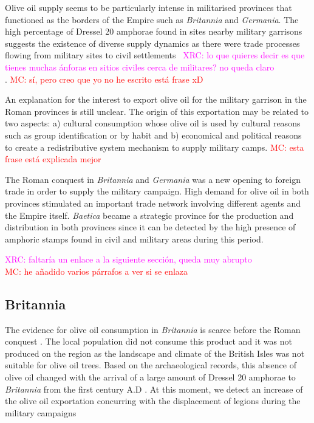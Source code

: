 \documentclass[review]{elsarticle}
\newcommand{\memo}[2]{\textcolor{#1}{#2}}
\newcommand{\maria}[1]{\memo{red}{MC: #1\\}}
\newcommand{\xavi}[1]{\memo{magenta}{XRC: #1\\}}
\begin{document}
Olive oil supply seems to be particularly intense in militarised provinces that functioned as the borders of the Empire such as \textit{Britannia} and \textit{Germania}. The high percentage of Dressel 20 amphorae found in sites nearby military garrisons suggests the existence of diverse supply dynamics as there were trade processes flowing from military sites to civil settlements~\citep{remesal_annona_1986, carreras_britannia_1998}
\xavi{lo que quieres decir es que tienes muchas ánforas en sitios civiles cerca de militares? no queda claro}.
\maria{sí, pero creo que yo no he escrito está frase xD}

An explanation for the interest to export olive oil for the military garrison in the Roman provinces is still unclear. The origin of this exportation may be related to two aspects: a) cultural consumption whose olive oil is used by cultural reasons such as group identification or by habit and b) economical and political reasons to create a redistributive system mechanism to supply military camps. 
\maria{esta frase está explicada mejor}


The Roman conquest in \textit{Britannia} and \textit{Germania} was a new opening to foreign trade in order to supply the military campaign. High demand for olive oil in both provinces stimulated an important trade network involving different agents and the Empire itself. \textit{Baetica} became a strategic province for the production and distribution in both provinces since it can be detected by the high presence of amphoric stamps found in civil and military areas during this period. 

\xavi{faltaría un enlace a la siguiente sección, queda muy abrupto}
\maria{he añadido varios párrafos a ver si se enlaza}


\subsection{Britannia}

The evidence for olive oil consumption in \textit{Britannia} is scarce before the Roman conquest \citep{funari_corpus_1996,carreras_abastecimiento_2003}. The local population did not consume this product and it was not produced on the region as the landscape and climate of the British Isles was not suitable for olive oil trees\citep[161]{monfort_britanniaen_1998}. Based on the archaeological records, this absence of olive oil changed with the arrival of a large amount of Dressel 20 amphorae to \textit{Britannia} from the first century A.D \citep{peacock_amphorae_1991,
carreras_britannia_1998}. At this moment, we detect an increase of the olive oil exportation concurring with the displacement of legions during the military campaigns \citep[161]{monfort_britanniaen_1998}
\end{document}
